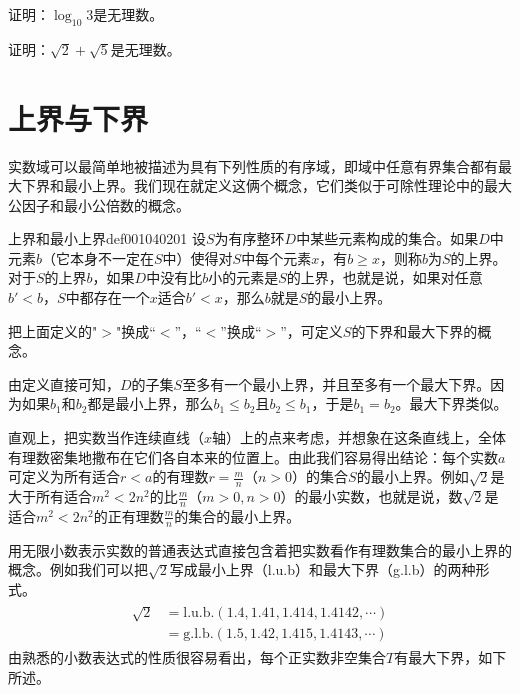 \begin{problem}
证明：$\log_{10}{3}$是无理数。
\end{problem}

\begin{problem}
证明：$\sqrt{2} + \sqrt{5}$是无理数。
\end{problem}



\section{上界与下界}\label{subsection0010402}
实数域可以最简单地被描述为具有下列性质的有序域，即域中任意有界集合都有最大下界和最小上界。我们现在就定义这俩个概念，它们类似于可除性理论中的最大公因子和最小公倍数的概念。

\begin{definition}{上界和最小上界}{def001040201}
设$S$为有序整环$D$中某些元素构成的集合。如果$D$中元素$b$（它本身不一定在$S$中）使得对$S$中每个元素$x$，有$b \ge x$，则称$b$为$S$的上界。对于$S$的上界$b$，如果$D$中没有比$b$小的元素是$S$的上界，也就是说，如果对任意$b' < b$，$S$中都存在一个$x$适合$b'<x$，那么$b$就是$S$的最小上界。
\end{definition}

把上面定义的"$>$"换成“$<$”，“$<$”换成“$>$”，可定义$S$的下界和最大下界的概念。

由定义直接可知，$D$的子集$S$至多有一个最小上界，并且至多有一个最大下界。因为如果$b_1$和$b_2$都是最小上界，那么$b_1 \le b_2$且$b_2 \le b_1$，于是$b_1=b_2$。最大下界类似。

直观上，把实数当作连续直线（$x$轴）上的点来考虑，并想象在这条直线上，全体有理数密集地撒布在它们各自本来的位置上。由此我们容易得出结论：每个实数$a$可定义为所有适合$r < a$的有理数$r = \frac{m}{n}$（$n > 0$）的集合$S$的最小上界。例如$\sqrt{2}$是大于所有适合$m^2 < 2n^2$的比$\frac{m}{n}$（$m > 0, n > 0$）的最小实数，也就是说，数$\sqrt{2}$是适合$m^2<2n^2$的正有理数$\frac{m}{n}$的集合的最小上界。

用无限小数表示实数的普通表达式直接包含着把实数看作有理数集合的最小上界的概念。例如我们可以把$\sqrt{2}$写成最小上界（l.u.b）和最大下界（g.l.b）的两种形式。
\begin{gather}\label{equ001040204}
\begin{aligned}
\sqrt{2} &= \text{l.u.b.}(1.4,1.41,1.414,1.4142,\cdots)\\
&=\text{g.l.b.}(1.5, 1.42, 1.415, 1.4143,\cdots)
\end{aligned}
\end{gather}
由熟悉的小数表达式的性质很容易看出，每个正实数非空集合$T$有最大下界，如下所述。

